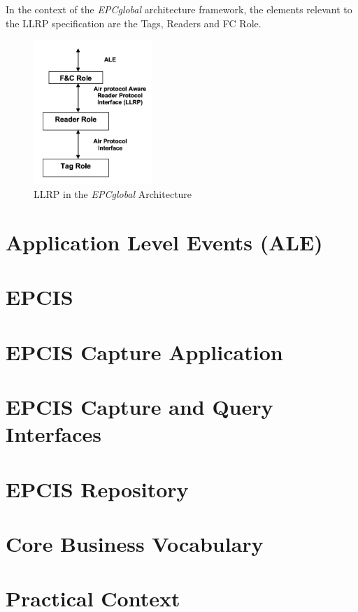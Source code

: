 In the context of the \emph{EPCglobal} architecture framework, the elements relevant to the LLRP specification are the Tags, Readers and \gls{FC} Role.

\begin{figure}[!ht]
    \centering
    \includegraphics[width=0.4\textwidth]{./assets/02-state-of-the-art/llrp-interaction}
    \caption{\gls{LLRP} in the \emph{EPCglobal} Architecture~\cite{Llrp1standard20101013Pdf}} 
    \label{fig:02:llrp-interaction}
\end{figure}


\section{Application Level Events (ALE)}

\section{EPCIS}


\section{EPCIS Capture Application}

\section{EPCIS Capture and Query Interfaces}

\section{EPCIS Repository}

\section{Core Business Vocabulary}

\section{Practical Context}

